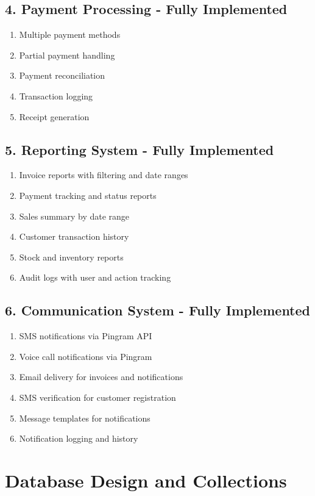 \documentclass[12pt,a4paper]{report}
\begin{document}
\subsection{4. Payment Processing - Fully Implemented}
\begin{enumerate}[label=\roman*)]
    \item Multiple payment methods
    \item Partial payment handling
    \item Payment reconciliation
    \item Transaction logging
    \item Receipt generation
\end{enumerate}

\subsection{5. Reporting System - Fully Implemented}
\begin{enumerate}[label=\roman*)]
    \item Invoice reports with filtering and date ranges
    \item Payment tracking and status reports
    \item Sales summary by date range
    \item Customer transaction history
    \item Stock and inventory reports
    \item Audit logs with user and action tracking
\end{enumerate}

\subsection{6. Communication System - Fully Implemented}
\begin{enumerate}[label=\roman*)]
    \item SMS notifications via Pingram API
    \item Voice call notifications via Pingram
    \item Email delivery for invoices and notifications
    \item SMS verification for customer registration
    \item Message templates for notifications
    \item Notification logging and history
\end{enumerate}

\section{Database Design and Collections}
\end{document}
